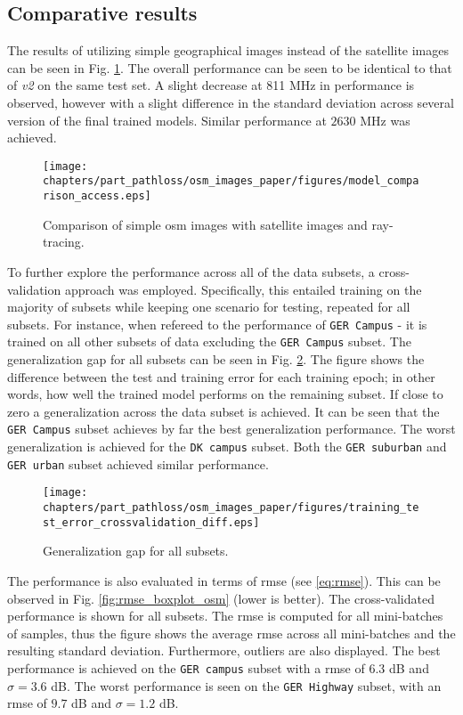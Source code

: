 \newpage
\newpage


\subsection{Comparative results}
The results of utilizing simple geographical images instead of the satellite images can be seen in Fig. \ref{fig:model_comparison_access}. The overall performance can be seen to be identical to that of \emph{v2} on the same test set. A slight decrease at 811 MHz in performance is observed, however with a slight difference in the standard deviation across several version of the final trained models. Similar performance at $2630$ MHz was achieved.

\begin{figure}[h]
    \centering
    \texttt{[image: chapters/part\_pathloss/osm\_images\_paper/figures/model\_comparison\_access.eps]}
    \caption{Comparison of simple \gls{osm} images with satellite images and ray-tracing.}
    \label{fig:model_comparison_access}
\end{figure}


To further explore the performance across all of the data subsets, a cross-validation approach was employed. Specifically, this entailed training on the majority of subsets while keeping one scenario for testing, repeated for all subsets. For instance, when refereed to the performance of \texttt{GER Campus} - it is trained on all other subsets of data excluding the \texttt{GER Campus} subset. The generalization gap for all subsets can be seen in Fig. \ref{fig:generalization_gap}. The figure shows the difference between the test and training error for each training epoch; in other words, how well the trained model performs on the remaining subset. If close to zero a generalization across the data subset is achieved. It can be seen that the \texttt{GER Campus} subset achieves by far the best generalization performance. The worst generalization is achieved for the \texttt{DK campus} subset. Both the \texttt{GER suburban} and \texttt{GER urban} subset achieved similar performance.

\begin{figure}[h]
    \centering
    \texttt{[image: chapters/part\_pathloss/osm\_images\_paper/figures/training\_test\_error\_crossvalidation\_diff.eps]}
    \caption{Generalization gap for all subsets.}
    \label{fig:generalization_gap}
\end{figure}

The performance is also evaluated in terms of \gls{rmse} (see \ref{eq:rmse}). This can be observed in Fig. \ref{fig:rmse_boxplot_osm} (lower is better). The cross-validated performance is shown for all subsets. The \gls{rmse} is computed for all mini-batches of samples, thus the figure shows the average \gls{rmse} across all mini-batches and the resulting standard deviation. Furthermore, outliers are also displayed. The best performance is achieved on the \texttt{GER campus} subset with a \gls{rmse} of $6.3$ dB and $\sigma = 3.6$ dB. The worst performance is seen on the \texttt{GER Highway} subset, with an \gls{rmse} of $9.7$ dB and $\sigma = 1.2$ dB.


